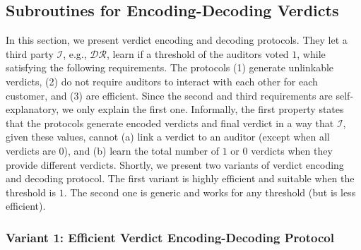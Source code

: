 
\vspace{-3.5mm}
\subsection{Subroutines for  Encoding-Decoding Verdicts}\label{sec::Encoding-Decoding-Verdicts}

\vspace{-1mm}

In this section, we present verdict encoding and decoding protocols. They let a third party $\mathcal{I}$, e.g., $\mathcal{DR}$, learn if a threshold of the auditors voted $1$, while satisfying the following requirements.  The protocols  (1) generate unlinkable verdicts, (2) do not require auditors to interact with each other for each customer, and (3) are efficient. Since the second and third requirements are self-explanatory,  we only explain the first one.  Informally, the first property states that the protocols generate encoded verdicts and final verdict in a way that $\mathcal{I}$,  given these values, cannot (a)   link a  verdict to an auditor (except when all verdicts are $0$), and (b) learn the total number of $1$ or $0$ verdicts when they provide different verdicts.  Shortly, we present two variants of verdict encoding and decoding protocol. The first variant is highly efficient and suitable when the threshold is $1$. The second one is generic and works for any threshold (but is less efficient). 


\vspace{-2mm}
\subsubsection{Variant 1:  Efficient Verdict  Encoding-Decoding Protocol}



